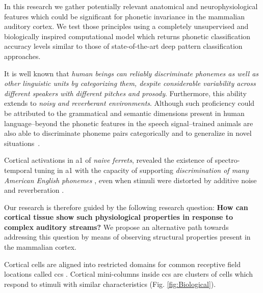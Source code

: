 \documentclass[10pt,letterpaper]{article}
\begin{document}
\iffalse
In this research we gather potentially relevant anatomical and neurophysiological features which could be significant for phonetic invariance in the mammalian auditory cortex. We test those principles using a completely unsupervised and biologically inspired computational model which returns phonetic classification accuracy levels similar to those of state-of-the-art deep pattern classification approaches.

It is well known that \emph{human beings can reliably discriminate phonemes as well as other linguistic units by categorizing them, despite considerable variability across different speakers with different pitches and prosody}. Furthermore, this ability extends to \emph{noisy and reverberant environments}.
Although such proficiency could be attributed to the grammatical and semantic dimensions present in human language--beyond the phonetic features in the speech signal--trained animals are also able to discriminate phoneme pairs categorically and to generalize in novel situations~\cite{kuhl_1975, kuhl_1983, kluender_1998, pons_2006, hienz_1996, dent_1997, lotto_1997}.

Cortical activations in \gls{a1} of \emph{naive ferrets}, revealed the existence of spectro-temporal tuning in \gls{a1} with the capacity of supporting \emph{discrimination of many American English phonemes} \cite{mesgarani_2008}, even when stimuli were distorted by additive noise and reverberation \cite{mesgarani_2014A}.

Our research is therefore guided by the following research question: \textbf{How can cortical tissue show such physiological properties in response to complex auditory streams?} We propose an alternative path towards addressing this question by means of observing structural properties present in the mammalian cortex.

Cortical cells are aligned into restricted domains for common receptive field locations called \glspl{cc} \cite{mountcastle_1955, mountcastle_1957, hubel_1962, hubel_1968}. Cortical mini-columns inside \glspl{cc} are clusters of cells which respond to stimuli with similar characteristics (Fig. \ref{fig:Biological}).
\end{document}
